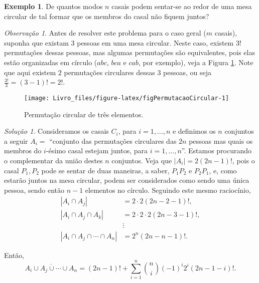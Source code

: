 \documentclass[]{book}
\theoremstyle{definition}
\theoremstyle{definition}
\newtheorem{example}{Exemplo}[chapter]
\theoremstyle{definition}
\theoremstyle{remark}
\newtheorem*{remark}{Observação}
\newtheorem*{solution}{Solução}
\begin{document}
\begin{example}
\protect\hypertarget{exm:unnamed-chunk-72}{}{\label{exm:unnamed-chunk-72} }De quantos modos \(n\) casais podem sentar-se ao redor de uma mesa circular de tal formar que os membros do casal não fiquem juntos?
\end{example}

\begin{remark}
\iffalse{} {Observação. } \fi{}Antes de resolver este problema para o caso geral (\(m\) casais), suponha que existam \(3\) pessoas em uma mesa circular.
Neste caso, existem \(3!\) permutações dessas pessoas, mas algumas permutações são equivalentes, pois elas estão organizadas em círculo (\(abc\), \(bca\) e \(cab\), por exemplo), veja a Figura \ref{fig:figPermutacaoCircular}.
Note que aqui existem \(2\) permutações circulares dessas \(3\) pessoas, ou seja \(\frac{3!}{3}=(3-1)!=2!\).
\end{remark}

\begin{figure}

{\centering \texttt{[image: Livro\_files/figure-latex/figPermutacaoCircular-1]} 

}

\caption{Permutação circular de três elementos.}\label{fig:figPermutacaoCircular}
\end{figure}

\begin{solution}
\iffalse{} {Solução. } \fi{}Consideramos os casais \(C_i\), para \(i=1,\ldots, n\) e definimos os \(n\) conjuntos a seguir
\(A_i =\) ``conjunto das permutações circulares das \(2n\) pessoas mas quais os membros do \(i\)-ésimo casal estejam juntos, para \(i=1,\ldots, n\)''.
Estamos procurando o complementar da união destes \(n\) conjuntos.
Veja que \(|A_i| = 2(2n-1)!\), pois o casal \(P_1,P_2\) pode se sentar de duas maneiras, a saber, \(P_1 P_2\) e \(P_2 P_1\), e, como estarão juntos na mesa circular, podem ser considerados como sendo uma única pessoa, sendo então \(n-1\) elementos no círculo.
Seguindo este mesmo raciocínio,
\begin{align}
|A_i \cap A_j| &= 2 \cdot 2 (2n - 2 -1)!, \\
|A_i \cap A_j \cap A_k| &= 2 \cdot 2 \cdot 2 (2n - 3 -1)!, \\
&\vdots \\
|A_i \cap A_j \cap \cdots \cap A_n| &= 2^n (2n - n -1)!.
\end{align}

Então,
\[\overline{A_i \cup A_j \cup \cdots \cup A_n} = (2n-1)! + \sum_{i=1}^{n}{n\choose i}(-1)^i2^i(2n-1-i)!.\]
\end{solution}
\end{document}
